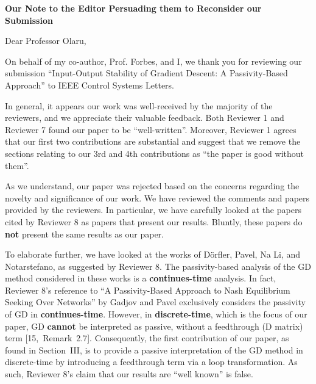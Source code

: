 \thispagestyle{empty}
\setcounter{page}{0}
\begin{center}
    {\LARGE\textbf{Our Note to the Editor Persuading them to Reconsider our Submission}}
\end{center}
\begin{flushleft}
    Dear Professor Olaru,

    On behalf of my co-author, Prof. Forbes, and I, we thank you for reviewing our submission ``Input-Output Stability of Gradient Descent: A Passivity-Based Approach'' to IEEE Control Systems Letters.

    In general, it appears our work was well-received by the majority of the reviewers, and we appreciate their valuable feedback. Both Reviewer 1 and Reviewer 7 found our paper to be ``well-written''. Moreover, Reviewer 1 agrees that our first two contributions are substantial and suggest that we remove the sections relating to our 3rd and 4th contributions as ``the paper is good without them''.
    
    As we understand, our paper was rejected based on the concerns regarding the novelty and significance of our work. We have reviewed the comments and papers provided by the reviewers. In particular, we have carefully looked at the papers cited by Reviewer 8 as papers that present our results. Bluntly, these papers do \textbf{not} present the same results as our paper.

    To elaborate further, we have looked at the works of Dörfler, Pavel, Na Li, and Notarstefano, as suggested by Reviewer 8. The passivity-based analysis of the GD method considered in these works is a \textbf{continues-time} analysis. In fact, Reviewer 8's reference to ``A Passivity-Based Approach to Nash Equilibrium Seeking Over Networks'' by Gadjov and Pavel exclusively considers the passivity of GD in \textbf{continues-time}. However, in \textbf{discrete-time}, which is the focus of our paper, GD \textbf{cannot} be interpreted as passive, without a feedthrough (D matrix) term \mbox{[15, Remark 2.7]}. Consequently, the first contribution of our paper, as found in Section~III, is to provide a passive interpretation of the GD method in discrete-time by introducing a feedthrough term via a loop transformation. As such, Reviewer 8's claim that our results are ``well known'' is false.


\end{flushleft}
